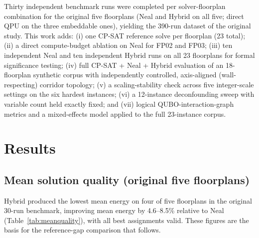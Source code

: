 \documentclass[11pt]{article}
\begin{document}
Thirty independent benchmark runs were completed per solver-floorplan combination for the original five floorplans (Neal and Hybrid on all five; direct QPU on the three embeddable ones), yielding the 390-run dataset of the original study. This work adds: (i) one CP-SAT reference solve per floorplan (23 total); (ii) a direct compute-budget ablation on Neal for FP02 and FP03; (iii) ten independent Neal and ten independent Hybrid runs on all 23 floorplans for formal significance testing; (iv) full CP-SAT + Neal + Hybrid evaluation of an 18-floorplan synthetic corpus with independently controlled, axis-aligned (wall-respecting) corridor topology; (v) a scaling-stability check across five integer-scale settings on the six hardest instances; (vi) a 12-instance deconfounding sweep with variable count held exactly fixed; and (vii) logical QUBO-interaction-graph metrics and a mixed-effects model applied to the full 23-instance corpus.

\section{Results}

\subsection{Mean solution quality (original five floorplans)}
Hybrid produced the lowest mean energy on four of five floorplans in the original 30-run benchmark, improving mean energy by 4.6--8.5\% relative to Neal (Table~\ref{tab:meanquality}), with all best assignments valid. These figures are the basis for the reference-gap comparison that follows.
\end{document}
